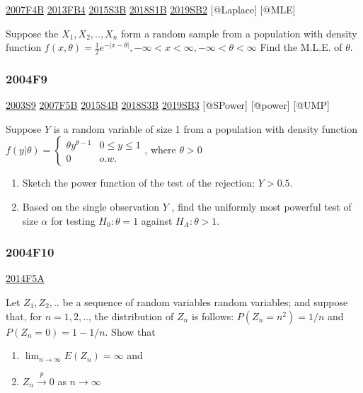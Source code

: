 \documentclass[6pt,twocolumn,Portrait]{article}
\begin{document}
\protect\hyperlink{f4b}{2007F4B} \protect\hyperlink{fb4-2}{2013FB4}
\protect\hyperlink{s3b-1}{2015S3B} \protect\hyperlink{s1b-2}{2018S1B}
\protect\hyperlink{sb2-3}{2019SB2} {[}@Laplace{]} {[}@MLE{]}

Suppose the \(X_1,X_2,..,X_n\) form a random sample from a population
with density function
\(f(x,\theta) =\frac12e^{-|x-\theta|}, -\infty<x<\infty, -\infty<\theta<\infty\)
Find the M.L.E. of \(\theta\).

\hypertarget{f9-2}{%
\subsubsection{2004F9}\label{f9-2}}

\protect\hyperlink{s9}{2003S9} \protect\hyperlink{f5b}{2007F5B}
\protect\hyperlink{s4b-1}{2015S4B} \protect\hyperlink{s3b-2}{2018S3B}
\protect\hyperlink{sb3-3}{2019SB3} {[}@SPower{]} {[}@power{]} {[}@UMP{]}

Suppose \(Y\) is a random variable of size 1 from a population with
density function
\(f(y|\theta)=\begin{cases}\theta y^{\theta-1}& 0\le y\le1\\0& o.w.\end{cases}\),
where \(\theta>0\)

\begin{enumerate}
\def\labelenumi{(\alph{enumi})}
\item
  Sketch the power function of the test of the rejection: \(Y>0.5\).
\item
  Based on the single observation \(Y\) , find the uniformly most
  powerful test of size \(\alpha\) for testing \(H_0:\theta=1\) against
  \(H_A :\theta>1\).
\end{enumerate}

\hypertarget{f10}{%
\subsubsection{2004F10}\label{f10}}

\protect\hyperlink{f5a-1}{2014F5A}

Let \(Z_1,Z_2,..\) be a sequence of random variables random variables;
and suppose that, for \(n=1,2,..\), the distribution of \(Z_n\) is
follows: \(P(Z_n=n^2)=1/n\) and \(P(Z_n=0)=1-1/n\). Show that

\begin{enumerate}
\def\labelenumi{(\alph{enumi})}
\item
  \(\lim_{n\to\infty}E(Z_n)=\infty\) and
\item
  \(Z_n\overset{p}\to0\) as \(n\to\infty\)
\end{enumerate}
\end{document}
